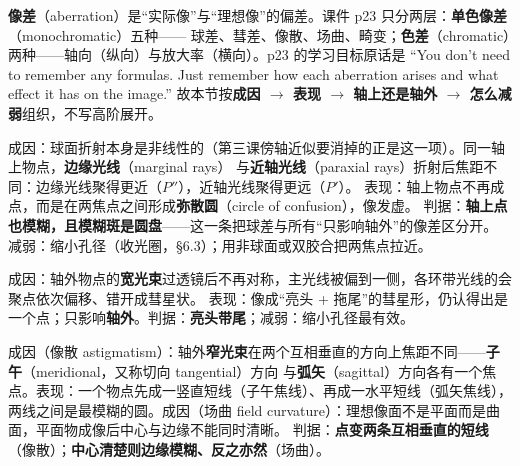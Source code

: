 ﻿\documentclass[11pt]{ctexart}
\begin{document}


\textbf{像差}（aberration）是“实际像”与“理想像”的偏差。课件 p23 只分两层：\textbf{单色像差}（monochromatic）五种——
球差、彗差、像散、场曲、畸变；\textbf{色差}（chromatic）两种——轴向（纵向）与放大率（横向）。p23 的学习目标原话是
“You don't need to remember any formulas. Just remember how each aberration arises and what effect it has on the image.”
故本节按\textbf{成因 $\to$ 表现 $\to$ 轴上还是轴外 $\to$ 怎么减弱}组织，不写高阶展开。


成因：球面折射本身是非线性的（第三课傍轴近似要消掉的正是这一项）。同一轴上物点，\textbf{边缘光线}（marginal rays）
与\textbf{近轴光线}（paraxial rays）折射后焦距不同：边缘光线聚得更近（$P''$），近轴光线聚得更远（$P'$）。
表现：轴上物点不再成点，而是在两焦点之间形成\textbf{弥散圆}（circle of confusion），像发虚。
判据：\textbf{轴上点也模糊，且模糊斑是圆盘}——这一条把球差与所有“只影响轴外”的像差区分开。
减弱：缩小孔径（收光圈，§6.3）；用非球面或双胶合把两焦点拉近。


成因：轴外物点的\textbf{宽光束}过透镜后不再对称，主光线被偏到一侧，各环带光线的会聚点依次偏移、错开成彗星状。
表现：像成“亮头 + 拖尾”的彗星形，仍认得出是一个点；只影响\textbf{轴外}。判据：\textbf{亮头带尾}；减弱：缩小孔径最有效。


成因（像散 astigmatism）：轴外\textbf{窄光束}在两个互相垂直的方向上焦距不同——\textbf{子午}（meridional，又称切向 tangential）方向
与\textbf{弧矢}（sagittal）方向各有一个焦点。表现：一个物点先成一竖直短线（子午焦线）、再成一水平短线（弧矢焦线），
两线之间是最模糊的圆。成因（场曲 field curvature）：理想像面不是平面而是曲面，平面物成像后中心与边缘不能同时清晰。
判据：\textbf{点变两条互相垂直的短线}（像散）；\textbf{中心清楚则边缘模糊、反之亦然}（场曲）。


\end{document}
